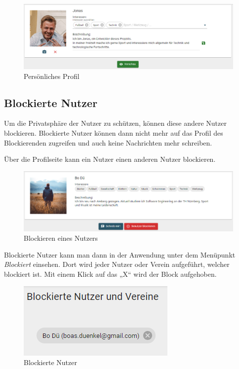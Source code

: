 \begin{figure}[ht!]
  \begin{centering}
    \includegraphics[width=1\textwidth]{figures/implementation/my-profile-header.png}
    \caption{Persönliches Profil}
    \label{fig:myProfileHeader}
  \end{centering}
\end{figure}

\subsection{Blockierte Nutzer}
\label{sec:blockedusers}

Um die Privatsphäre der Nutzer zu schützen, können diese andere Nutzer blockieren.
Blockierte Nutzer können dann nicht mehr auf das Profil des Blockierenden zugreifen und auch keine Nachrichten mehr schreiben.

Über die Profilseite kann ein Nutzer einen anderen Nutzer blockieren.

\begin{figure}[ht!]
  \begin{centering}
    \includegraphics[width=1\textwidth]{figures/implementation/profile-header.png}
    \caption{Blockieren eines Nutzers}
    \label{fig:blockUser}
  \end{centering}
\end{figure}

Blockierte Nutzer kann man dann in der Anwendung unter dem Menüpunkt \textit{Blockiert} einsehen.
Dort wird jeder Nutzer oder Verein aufgeführt, welcher blockiert ist.
Mit einem Klick auf das „X“ wird der Block aufgehoben.

\begin{figure}[ht!]
  \begin{centering}
    \includegraphics[width=.5\textwidth]{figures/implementation/blocked.png}
    \caption{Blockierte Nutzer}
    \label{fig:blocked}
  \end{centering}
\end{figure}

